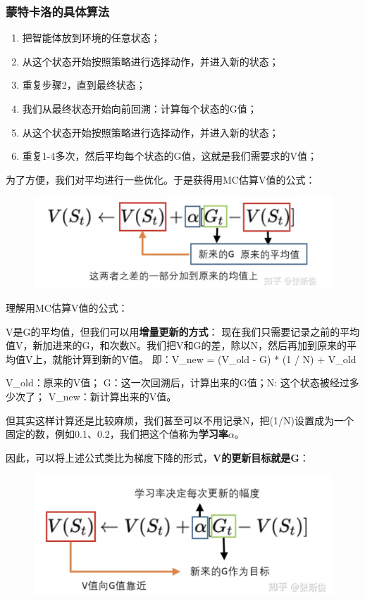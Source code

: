 \documentclass[12pt]{article}
\begin{document}
\subsubsection{蒙特卡洛的具体算法}
\begin{enumerate}
\setlength{\itemsep}{0pt}
\setlength{\parsep}{0pt}
\setlength{\parskip}{0pt}
    \item 把智能体放到环境的任意状态；
    \item 从这个状态开始按照策略进行选择动作，并进入新的状态；
    \item 重复步骤2，直到最终状态；
    \item 我们从最终状态开始向前回溯：计算每个状态的G值；
    \item 从这个状态开始按照策略进行选择动作，并进入新的状态；
    \item 重复1-4多次，然后平均每个状态的G值，这就是我们需要求的V值；
\end{enumerate}

为了方便，我们对平均进行一些优化。于是获得用MC估算V值的公式：
\begin{figure}[H]
    \centering
    \includegraphics[width=.5\textwidth]{fig/ReinforcementLearning/RL_Compute_V_By_MC.png}
\end{figure}


\begin{framed}
理解用MC估算V值的公式：

V是G的平均值，但我们可以用\textbf{增量更新的方式}： 现在我们只需要记录之前的平均值V，新加进来的G，和次数N。我们把V和G的差，除以N，然后再加到原来的平均值V上，就能计算到新的V值。 即：V\_new = (V\_old - G) * (1 / N) + V\_old

V\_old：原来的V值； G：这一次回溯后，计算出来的G值；N: 这个状态被经过多少次了； V\_new：新计算出来的V值。

但其实这样计算还是比较麻烦，我们甚至可以不用记录N，把(1/N)设置成为一个固定的数，例如0.1、0.2，我们把这个值称为\textbf{学习率$\alpha$}。

因此，可以将上述公式类比为梯度下降的形式，\textbf{V的更新目标就是G}：
\begin{figure}[H]
    \centering
    \includegraphics[width=.5\textwidth]{fig/ReinforcementLearning/RL_G_Meaning_5.png}
\end{figure}
\end{framed}
\end{document}
